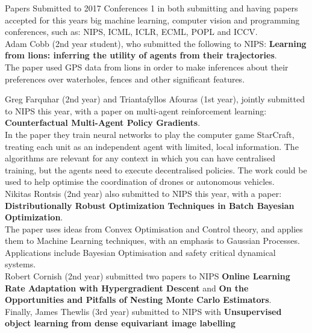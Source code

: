 \documentclass[10pt,final]{papertex}
\begin{document}
\newssep

\begin{news}{1}
	{Papers Submitted to 2017 Conferences}
	{}
	{}
	{1}
\noindent in both submitting and having papers accepted for this years big machine learning, computer vision and programming conferences, such as: NIPS, ICML, ICLR, ECML, POPL and ICCV.\\

Adam Cobb (2nd year student), who submitted the following to NIPS:\hspace{0.1mm} \textbf{Learning from  lions: inferring the utility of agents from their trajectories}.\\
The paper used GPS data from lions in order to make inferences about their preferences over waterholes, fences and other significant features.

\noindent Greg Farquhar (2nd year) and Triantafyllos Afouras (1st year), jointly submitted to NIPS this year, with a paper on multi-agent reinforcement learning:\hspace{0.1mm}\textbf{ Counterfactual Multi-Agent Policy Gradients}.\\
In the paper they train neural networks to play the computer game StarCraft, treating each unit as an independent agent with limited, local information. The algorithms are relevant for any context in which you can have centralised training, but the agents need to execute decentralised policies. The work could be used to help optimise the coordination of drones or autonomous vehicles.\\
Nikitas Rontsis (2nd year) also submitted to NIPS this year, with a paper: \textbf{Distributionally Robust Optimization Techniques in Batch Bayesian Optimization}.\\
 The paper  uses ideas from Convex Optimisation and Control theory, and applies them to Machine Learning techniques, with an emphasis to Gaussian Processes. Applications include Bayesian Optimisation and safety critical dynamical systems.\\
 Robert Cornish (2nd year) submitted two papers to NIPS \textbf{Online Learning Rate Adaptation with Hypergradient Descent } and \textbf{On the Opportunities and Pitfalls of Nesting Monte Carlo Estimators}.\\
 Finally, James Thewlis (3rd year) submitted to NIPS with \textbf{ Unsupervised object learning from dense equivariant image labelling}\\
 

\end{news}
\end{document}
